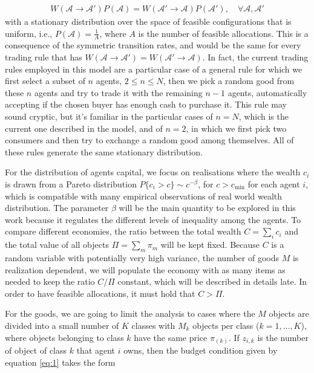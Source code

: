 \begin{align}
W(\mathcal{A} \to \mathcal{A}') P(\mathcal{A}) = W(\mathcal{A}'\to \mathcal{A})P(\mathcal{A}'),  \quad \forall \mathcal{A}, \mathcal{A}'
\end{align}
with a stationary distribution over the space of feasible configurations that is uniform, i.e., $P(\mathcal{A})= \frac{1}{A}$, where $A$ is the number of feasible allocations. This is a consequence of the symmetric transition rates, and would be the same for every trading rule that has $W(\mathcal{A}\to \mathcal{A}') = W(\mathcal{A}'\to \mathcal{A})$. In fact, the current trading rules employed in this model are a particular case of a general rule for which we first select a subset of $n$ agents, $2 \leq n \leq N$, then we pick a random good from these $n$ agents and try to trade it with the remaining $n-1$ agents, automatically accepting if the chosen buyer has enough cash to purchase it. This rule may sound cryptic, but it's familiar in the particular cases of $n=N$, which is the current one described in the model, and of $n=2$, in which we first pick two consumers and then try to exchange a random good among themselves. All of these rules generate the same stationary distribution.


For the distribution of agents capital, we focus on realisations where the wealth $c_i$ is drawn from a Pareto distribution $P\{c_i> c\} \sim c^{-\beta}$, for $c>c_{\min}$ for each agent $i$, which is compatible with many empirical observations of real world wealth distribution. The parameter $\beta$ will be the main quantity to be explored in this work because it regulates the different levels of inequality among the agents. To compare different economies, the ratio between the total wealth $C=\sum_i c_i$ and the total value of all objects $\Pi=\sum_{m}\pi_m$ will be kept fixed. Because $C$ is a random variable with potentially very high variance, the number of goods $M$ is realization dependent, we will populate the economy with as many items as needed to keep the ratio $C/\Pi$ constant, which will be described in details late. In order to have feasible allocations, it must hold that $C>\Pi$.

For the goods, we are going to limit the analysis to cases where the $M$ objects are divided into a small number of $K$ classes with $M_k$ objects per class ($k=1,\ldots,K$), where objects belonging to class $k$ have the same price $\pi_{(k)}$. If $z_{i,k}$ is the number of object of class $k$ that agent $i$ owns, then the budget condition given by equation \eqref{eq:1} takes the form

